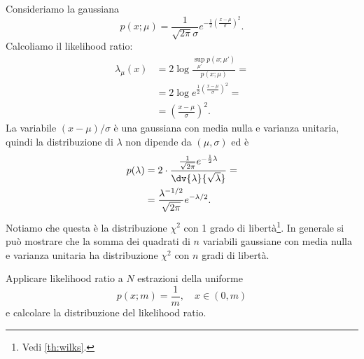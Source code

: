 \begin{example}
	\label{th:lrgauss}
	Consideriamo la gaussiana
	\begin{equation*}
		p(x;\mu)
		= \frac1{\sqrt{2\pi}\sigma} e^{-\frac12\left(\frac{x-\mu}\sigma\right)^2}.
	\end{equation*}
	Calcoliamo il likelihood ratio:
	\begin{align*}
		\lambda_\mu(x)
		&= 2\log\frac {\sup\limits_{\mu'} p(x;\mu')} {p(x;\mu)} = \\
		&= 2\log e^{\frac12\left(\frac{x-\mu}\sigma\right)^2} = \\
		&= \left(\frac{x-\mu}\sigma\right)^2.
	\end{align*}
	La variabile $(x-\mu)/\sigma$ è una gaussiana con media nulla e varianza unitaria,
	quindi la distribuzione di $\lambda$ non dipende da $(\mu,\sigma)$ ed è
	\begin{align*}
		p(\lambda)
		&= 2\cdot\frac {\frac1{\sqrt{2\pi}} e^{-\frac12 \lambda}} {\dv{\lambda}{\sqrt\lambda}} = \\
		&= \frac{\lambda^{-1/2}}{\sqrt{2\pi}}e^{-\lambda/2}.
	\end{align*}
	Notiamo che questa è la distribuzione $\chi^2$ con 1 grado di libertà\footnote{Vedi \autoref{th:wilks}.}.
	In generale si può mostrare che la somma dei quadrati di $n$ variabili gaussiane
	con media nulla e varianza unitaria
	ha distribuzione $\chi^2$ con $n$ gradi di libertà.
\end{example}

\begin{exercise}
	Applicare likelihood ratio a $N$ estrazioni della uniforme
	\begin{equation*}
		p(x;m)
		= \frac 1m,
		\quad x \in (0,m)
	\end{equation*}
	e calcolare la distribuzione del likelihood ratio.
\end{exercise}

